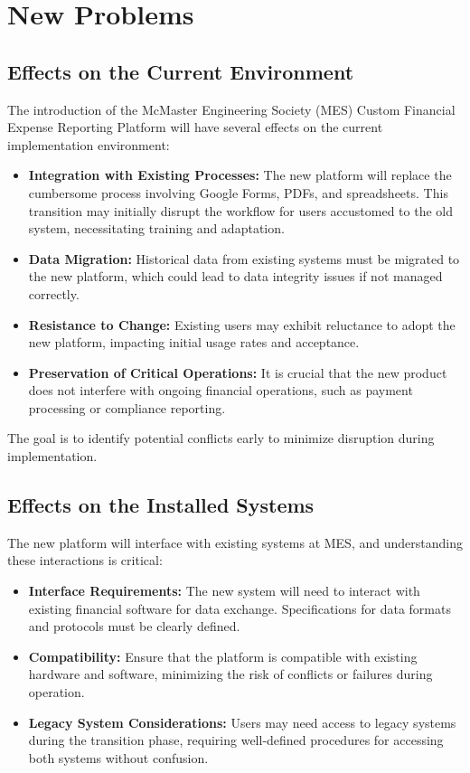 \documentclass[12pt]{article}
\begin{document}
\section{New Problems}

\subsection{Effects on the Current Environment}
The introduction of the McMaster Engineering Society (MES) Custom Financial Expense Reporting Platform will have several effects on the current implementation environment:

\begin{itemize}
    \item \textbf{Integration with Existing Processes:} The new platform will replace the cumbersome process involving Google Forms, PDFs, and spreadsheets. This transition may initially disrupt the workflow for users accustomed to the old system, necessitating training and adaptation.
    \item \textbf{Data Migration:} Historical data from existing systems must be migrated to the new platform, which could lead to data integrity issues if not managed correctly.
    \item \textbf{Resistance to Change:} Existing users may exhibit reluctance to adopt the new platform, impacting initial usage rates and acceptance.
    \item \textbf{Preservation of Critical Operations:} It is crucial that the new product does not interfere with ongoing financial operations, such as payment processing or compliance reporting.
\end{itemize}

The goal is to identify potential conflicts early to minimize disruption during implementation.

\subsection{Effects on the Installed Systems}
The new platform will interface with existing systems at MES, and understanding these interactions is critical:

\begin{itemize}
    \item \textbf{Interface Requirements:} The new system will need to interact with existing financial software for data exchange. Specifications for data formats and protocols must be clearly defined.
    \item \textbf{Compatibility:} Ensure that the platform is compatible with existing hardware and software, minimizing the risk of conflicts or failures during operation.
    \item \textbf{Legacy System Considerations:} Users may need access to legacy systems during the transition phase, requiring well-defined procedures for accessing both systems without confusion.
\end{itemize}
\end{document}
